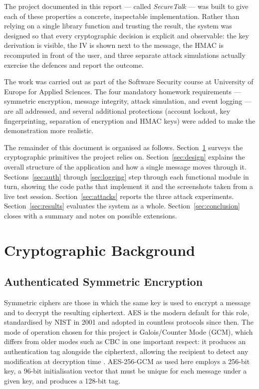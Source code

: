 \documentclass[conference]{IEEEtran}
\begin{document}
The project documented in this report --- called \textit{SecureTalk} --- was built to give each of these properties a concrete, inspectable implementation. Rather than relying on a single library function and trusting the result, the system was designed so that every cryptographic decision is explicit and observable: the key derivation is visible, the IV is shown next to the message, the HMAC is recomputed in front of the user, and three separate attack simulations actually exercise the defences and report the outcome.

The work was carried out as part of the Software Security course at University of Europe for Applied Sciences. The four mandatory homework requirements --- symmetric encryption, message integrity, attack simulation, and event logging --- are all addressed, and several additional protections (account lockout, key fingerprinting, separation of encryption and HMAC keys) were added to make the demonstration more realistic.

The remainder of this document is organised as follows. Section~\ref{sec:background} surveys the cryptographic primitives the project relies on. Section~\ref{sec:design} explains the overall structure of the application and how a single message moves through it. Sections~\ref{sec:auth} through \ref{sec:logging} step through each functional module in turn, showing the code paths that implement it and the screenshots taken from a live test session. Section~\ref{sec:attacks} reports the three attack experiments. Section~\ref{sec:results} evaluates the system as a whole. Section~\ref{sec:conclusion} closes with a summary and notes on possible extensions.

\section{Cryptographic Background}
\label{sec:background}

\subsection{Authenticated Symmetric Encryption}
Symmetric ciphers are those in which the same key is used to encrypt a message and to decrypt the resulting ciphertext. AES is the modern default for this role, standardised by NIST in 2001 and adopted in countless protocols since then. The mode of operation chosen for this project is Galois/Counter Mode (GCM), which differs from older modes such as CBC in one important respect: it produces an authentication tag alongside the ciphertext, allowing the recipient to detect any modification at decryption time \cite{nist_aes}. AES-256-GCM as used here employs a 256-bit key, a 96-bit initialisation vector that must be unique for each message under a given key, and produces a 128-bit tag.
\end{document}
